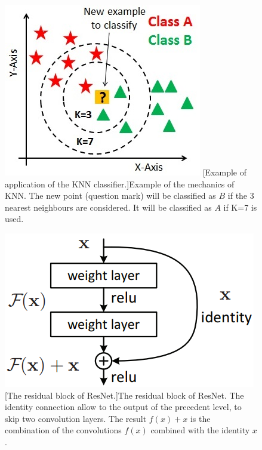 \begin{figure}
	\centering
	\begin{minipage}{.44\textwidth}
		\centering
		\includegraphics[width=1\linewidth]{images/recognition/howItWorks_knn}
		[Example of application of the KNN classifier.]{Example of the mechanics of KNN. The new point (question mark) will be classified as $B$ if the 3 nearest neighbours are considered. It will be classified as $A$ if K=7 is used.}
		\label{fig:howItWorks_knn}
	\end{minipage}
	\begin{minipage}{.54\textwidth}
		\centering
		\includegraphics[width=1\linewidth]{images/recognition/howItWorks_resNet}
		\captionsetup{margin=0.5cm}
		[The residual block of ResNet.]{The residual block of ResNet. The identity connection allow to the output of the precedent level, to skip two convolution layers. The result $f(x)+x$ is the combination of the convolutions $f(x)$ combined with the identity $x$.}
		\label{fig:howItWorks_resNet}
	\end{minipage}
\end{figure}



